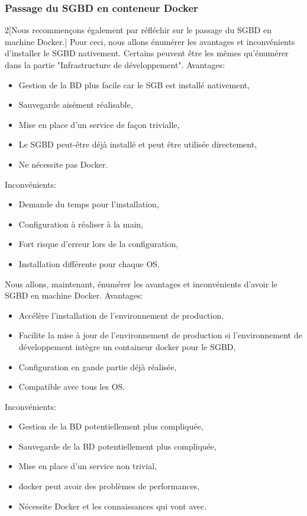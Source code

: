 \documentclass[
    iai, %
    il, %
]{heig-tb}
\begin{document}
\subsubsection{Passage du SGBD en conteneur Docker}
\begin{multicols}{2}[Nous recommençons également par réfléchir sur le passage du SGBD en machine Docker.]
    Pour ceci, nous allons énumérer les avantages et inconvénients d'installer le SGBD nativement.
    Certains peuvent être les mêmes qu'énumérer dans la partie "Infrastructure de développement". %
    Avantages:
    \begin{itemize}
        \item Gestion de la BD plus facile car le SGB est installé nativement,
        \item Sauvegarde aisément réalisable,
        \item Mise en place d'un service de façon trivialle,
        \item Le SGBD peut-être déjà installé et peut être utilisée directement,
        \item Ne nécessite pas Docker.
    \end{itemize}

    Inconvénients:
    \begin{itemize}
        \item Demande du temps pour l'installation,
        \item Configuration à réaliser à la main,
        \item Fort risque d'erreur lors de la configuration,
        \item Installation différente pour chaque OS.
    \end{itemize}

    \columnbreak
    Nous allons, maintenant, énumérer les avantages et inconvénients d'avoir le SGBD en machine Docker.
    Avantages:
    \begin{itemize}
        \item Accélère l'installation de l'environnement de production,
        \item Facilite la mise à jour de l'environnement de production si l'environnement de développement intègre un containeur docker pour le SGBD,
        \item Configuration en gande partie déjà réalisée,
        \item Compatible avec tous les OS.
    \end{itemize}

    Inconvénients:
    \begin{itemize}
        \item Gestion de la BD potentiellement plus compliquée,
        \item Sauvegarde de la BD potentiellement plus compliquée,
        \item Mise en place d'un service non trivial,
        \item \Gls{docker} peut avoir des problèmes de performances, \cite{labrecque}
        \item Nécessite Docker et les connaissances qui vont avec. \cite{labrecque}
    \end{itemize}
\end{multicols}
\end{document}
